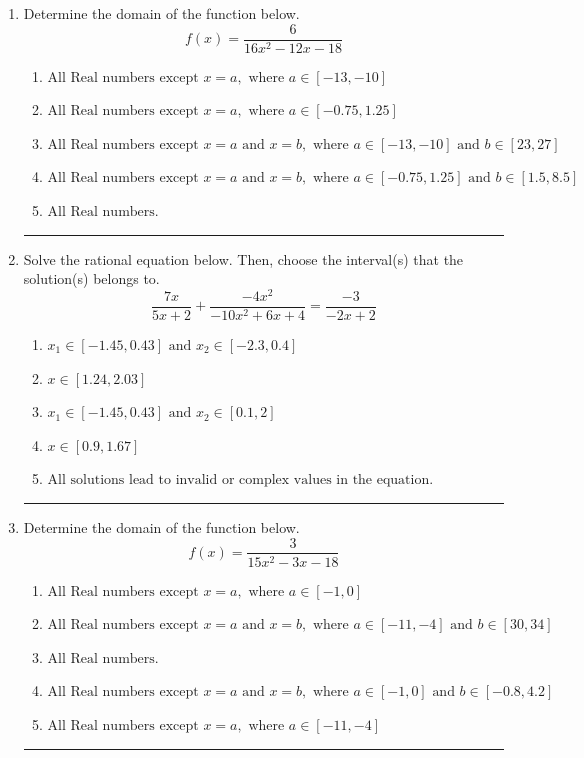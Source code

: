 \documentclass[14pt]{extbook}
\newcommand{\litem}[1]{\item#1\hspace*{-1cm}\rule{\textwidth}{0.4pt}}
\begin{document}
\begin{enumerate}
{\begin{enumerate}[label=\Alph*.]
\end{enumerate} }
\litem{
Determine the domain of the function below.\[ f(x) = \frac{6}{16x^{2} -12 x -18} \]\begin{enumerate}[label=\Alph*.]
\item \( \text{All Real numbers except } x = a, \text{ where } a \in [-13, -10] \)
\item \( \text{All Real numbers except } x = a, \text{ where } a \in [-0.75, 1.25] \)
\item \( \text{All Real numbers except } x = a \text{ and } x = b, \text{ where } a \in [-13, -10] \text{ and } b \in [23, 27] \)
\item \( \text{All Real numbers except } x = a \text{ and } x = b, \text{ where } a \in [-0.75, 1.25] \text{ and } b \in [1.5, 8.5] \)
\item \( \text{All Real numbers.} \)

\end{enumerate} }
\litem{
Solve the rational equation below. Then, choose the interval(s) that the solution(s) belongs to.\[ \frac{7x}{5x + 2} + \frac{-4x^{2}}{-10x^{2} +6 x + 4} = \frac{-3}{-2x + 2} \]\begin{enumerate}[label=\Alph*.]
\item \( x_1 \in [-1.45, 0.43] \text{ and } x_2 \in [-2.3,0.4] \)
\item \( x \in [1.24,2.03] \)
\item \( x_1 \in [-1.45, 0.43] \text{ and } x_2 \in [0.1,2] \)
\item \( x \in [0.9,1.67] \)
\item \( \text{All solutions lead to invalid or complex values in the equation.} \)

\end{enumerate} }
\litem{
Determine the domain of the function below.\[ f(x) = \frac{3}{15x^{2} -3 x -18} \]\begin{enumerate}[label=\Alph*.]
\item \( \text{All Real numbers except } x = a, \text{ where } a \in [-1, 0] \)
\item \( \text{All Real numbers except } x = a \text{ and } x = b, \text{ where } a \in [-11, -4] \text{ and } b \in [30, 34] \)
\item \( \text{All Real numbers.} \)
\item \( \text{All Real numbers except } x = a \text{ and } x = b, \text{ where } a \in [-1, 0] \text{ and } b \in [-0.8, 4.2] \)
\item \( \text{All Real numbers except } x = a, \text{ where } a \in [-11, -4] \)


\end{enumerate}}
\end{enumerate}
\end{document}
